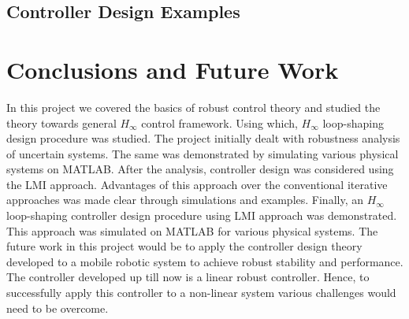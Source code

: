 \documentclass[a4paper,12pt]{article}
\begin{document}
	 \subsection{Controller Design Examples}
	 
\section{Conclusions and Future Work}
In this project we covered the basics of robust control theory and studied the theory towards general $H_{\infty}$ control framework. Using which, $H_{\infty}$ loop-shaping design procedure was studied. The project initially dealt with robustness analysis of uncertain systems. The same was demonstrated by simulating various physical systems on MATLAB. After the analysis, controller design was considered using the LMI approach. Advantages of this approach over the conventional iterative approaches was made clear through simulations and examples. Finally, an $H_{\infty}$ loop-shaping controller design procedure using LMI approach was demonstrated. This approach was simulated on MATLAB for various physical systems. The future work in this project would be to apply the controller design theory developed to a mobile robotic system to achieve robust stability and performance. The controller developed up till now is a linear robust controller. Hence, to successfully apply this controller to a non-linear system various challenges would need to be overcome.
\printbibliography 
\end{document}
